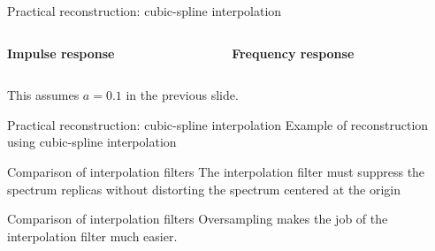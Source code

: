 \documentclass[10pt]{beamer}
\begin{document}
\begin{frame}{Practical reconstruction: cubic-spline interpolation}
	\begin{columns}[t]
		\begin{column}{0.5\textwidth}
			\textbf{Impulse response}
		\end{column}
		\begin{column}{0.5\textwidth}
			\textbf{Frequency response}
		\end{column}
	\end{columns}
	\begin{center}
		\resizebox{\linewidth}{!}{}
	\end{center}
This assumes $a = 0.1$ in the previous slide.
\end{frame}

\begin{frame}{Practical reconstruction: cubic-spline interpolation}
	Example of reconstruction using cubic-spline interpolation
	\begin{center}
		\resizebox{0.7\linewidth}{!}{}
	\end{center}
\end{frame}

\begin{frame}{Comparison of interpolation filters}
	The interpolation filter must suppress the spectrum replicas without distorting the spectrum centered at the origin 
	\begin{center}
		\resizebox{\linewidth}{!}{}
	\end{center}	
\end{frame}

\begin{frame}{Comparison of interpolation filters}
	Oversampling makes the job of the interpolation filter much easier. 
	\begin{center}
		\resizebox{\linewidth}{!}{}
	\end{center}
\end{frame}
\end{document}
